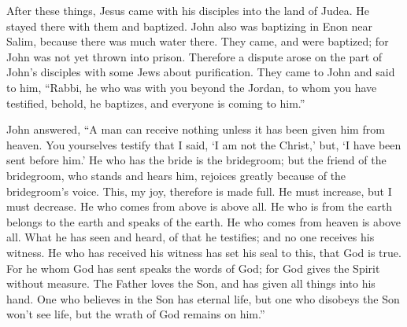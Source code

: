 {{{}}
\par }{\PP {}After these things, Jesus came with his disciples into the land of Judea. He stayed there with them and baptized.
John also was baptizing in Enon near Salim, because there was much water there. They came, and were baptized;
for John was not yet thrown into prison.
Therefore a dispute arose on the part of John’s disciples with some Jews about purification.
They came to John and said to him, “Rabbi, he who was with you beyond the Jordan, to whom you have testified, behold, he baptizes, and everyone is coming to him.”
\par }{\PP {}John answered, “A man can receive nothing unless it has been given him from heaven.
You yourselves testify that I said, ‘I am not the Christ,’ but, ‘I have been sent before him.’
He who has the bride is the bridegroom; but the friend of the bridegroom, who stands and hears him, rejoices greatly because of the bridegroom’s voice. This, my joy, therefore is made full.
He must increase, but I must decrease.
He who comes from above is above all. He who is from the earth belongs to the earth and speaks of the earth. He who comes from heaven is above all.
What he has seen and heard, of that he testifies; and no one receives his witness.
He who has received his witness has set his seal to this, that God is true.
For he whom God has sent speaks the words of God; for God gives the Spirit without measure.
The Father loves the Son, and has given all things into his hand.
One who believes in the Son has eternal life, but one who disobeys
 the Son won’t see life, but the wrath of God remains on him.”

}
